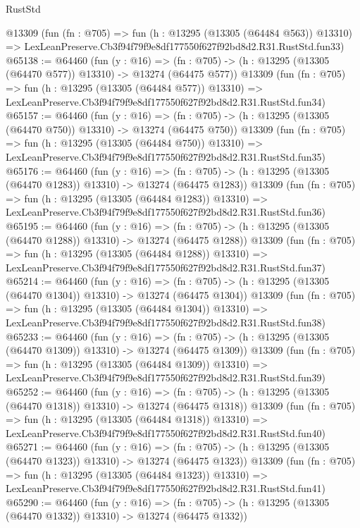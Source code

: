 \begin{lexlean}{RustStd}
\begin{coremodule}
    @13309
    (fun (fn : @705) =>
    fun (h : @13295 (@13305 (@64484 @563)) @13310) =>
    LexLeanPreserve.Cb3f94f79f9e8df177550f627f92bd8d2.R31.RustStd.fun33)
@65138 := @64460
    (fun (y : @16) =>
    (fn : @705) -> (h : @13295 (@13305 (@64470 @577)) @13310) -> @13274 (@64475 @577))
    @13309
    (fun (fn : @705) =>
    fun (h : @13295 (@13305 (@64484 @577)) @13310) =>
    LexLeanPreserve.Cb3f94f79f9e8df177550f627f92bd8d2.R31.RustStd.fun34)
@65157 := @64460
    (fun (y : @16) =>
    (fn : @705) -> (h : @13295 (@13305 (@64470 @750)) @13310) -> @13274 (@64475 @750))
    @13309
    (fun (fn : @705) =>
    fun (h : @13295 (@13305 (@64484 @750)) @13310) =>
    LexLeanPreserve.Cb3f94f79f9e8df177550f627f92bd8d2.R31.RustStd.fun35)
@65176 := @64460
    (fun (y : @16) =>
    (fn : @705) -> (h : @13295 (@13305 (@64470 @1283)) @13310) -> @13274 (@64475 @1283))
    @13309
    (fun (fn : @705) =>
    fun (h : @13295 (@13305 (@64484 @1283)) @13310) =>
    LexLeanPreserve.Cb3f94f79f9e8df177550f627f92bd8d2.R31.RustStd.fun36)
@65195 := @64460
    (fun (y : @16) =>
    (fn : @705) -> (h : @13295 (@13305 (@64470 @1288)) @13310) -> @13274 (@64475 @1288))
    @13309
    (fun (fn : @705) =>
    fun (h : @13295 (@13305 (@64484 @1288)) @13310) =>
    LexLeanPreserve.Cb3f94f79f9e8df177550f627f92bd8d2.R31.RustStd.fun37)
@65214 := @64460
    (fun (y : @16) =>
    (fn : @705) -> (h : @13295 (@13305 (@64470 @1304)) @13310) -> @13274 (@64475 @1304))
    @13309
    (fun (fn : @705) =>
    fun (h : @13295 (@13305 (@64484 @1304)) @13310) =>
    LexLeanPreserve.Cb3f94f79f9e8df177550f627f92bd8d2.R31.RustStd.fun38)
@65233 := @64460
    (fun (y : @16) =>
    (fn : @705) -> (h : @13295 (@13305 (@64470 @1309)) @13310) -> @13274 (@64475 @1309))
    @13309
    (fun (fn : @705) =>
    fun (h : @13295 (@13305 (@64484 @1309)) @13310) =>
    LexLeanPreserve.Cb3f94f79f9e8df177550f627f92bd8d2.R31.RustStd.fun39)
@65252 := @64460
    (fun (y : @16) =>
    (fn : @705) -> (h : @13295 (@13305 (@64470 @1318)) @13310) -> @13274 (@64475 @1318))
    @13309
    (fun (fn : @705) =>
    fun (h : @13295 (@13305 (@64484 @1318)) @13310) =>
    LexLeanPreserve.Cb3f94f79f9e8df177550f627f92bd8d2.R31.RustStd.fun40)
@65271 := @64460
    (fun (y : @16) =>
    (fn : @705) -> (h : @13295 (@13305 (@64470 @1323)) @13310) -> @13274 (@64475 @1323))
    @13309
    (fun (fn : @705) =>
    fun (h : @13295 (@13305 (@64484 @1323)) @13310) =>
    LexLeanPreserve.Cb3f94f79f9e8df177550f627f92bd8d2.R31.RustStd.fun41)
@65290 := @64460
    (fun (y : @16) =>
    (fn : @705) -> (h : @13295 (@13305 (@64470 @1332)) @13310) -> @13274 (@64475 @1332))

\end{coremodule}
\end{lexlean}
